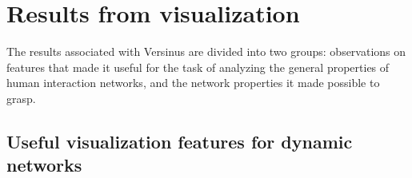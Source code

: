 																																																																																																																																																																																																																																																																																																																																																																																																				\section{Results from visualization}
																																																																																																																																																																																																																																																																																																																																																																																																				The results associated with Versinus are divided into two groups:
																																																																																																																																																																																																																																																																																																																																																																																																				observations on features that made it useful for the task of analyzing the general properties of human interaction networks,
																																																																																																																																																																																																																																																																																																																																																																																																				and the network properties it made possible to grasp.

																																																																																																																																																																																																																																																																																																																																																																																																				\subsection{Useful visualization features for dynamic networks}

